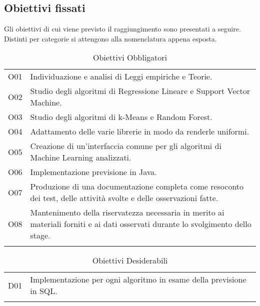 \subsection{Obiettivi fissati}
Gli obiettivi di cui viene previsto il raggiungimento sono presentati a seguire. Distinti per categorie si attengono alla nomenclatura appena esposta.
{\renewcommand{\arraystretch}{2}
\begin{longtable}{|p{1cm}| p{12.25cm}|}
	\hline
	\rowcolor{blue} \multicolumn{2}{|c|}{
	\textbf{\textcolor{white}{Obbligatori}}
	} \\
		\endhead
		\hline \rowcolor{lightbrown}
		O01 & 
		Individuazione e analisi di Leggi empiriche  e Teorie. \\	
		\hline \rowcolor{lighterbrown}
		O02 & 
		Studio degli algoritmi di Regressione Lineare e Support Vector Machine. \\	
		\hline \rowcolor{lightbrown}
		O03 & 
		Studio degli algoritmi di k-Means e Random Forest.\\	
	\hline \rowcolor{lighterbrown}
		O04 & 
		Adattamento delle varie librerie in modo da renderle uniformi.\\	
	\hline \rowcolor{lightbrown}
		O05 & 
		Creazione di un'interfaccia comune per gli algoritmi di Machine Learning analizzati.\\	
	\hline \rowcolor{lighterbrown}
		O06 & 
		Implementazione previsione in Java.\\	
	\hline \rowcolor{lightbrown}
		O07 & 
		Produzione di una documentazione completa come resoconto dei test, delle attività svolte e delle osservazioni fatte.\\	
	\hline \rowcolor{lighterbrown}
		O08 & 
		Mantenimento della riservatezza necessaria in merito ai materiali forniti e ai dati osservati durante lo svolgimento dello stage.\\	
	\hline
	\caption{Obiettivi Obbligatori}\label{tab:obb-ob}
\end{longtable}}

{\renewcommand{\arraystretch}{2}
\begin{longtable}{|p{1cm}| p{12.25cm} |}
	\hline
	\rowcolor{blue} \multicolumn{2}{|c|}{
	{\textcolor{white}{Desiderabili}}
	} \\
		\endhead
		\hline \rowcolor{lightbrown}
		D01 & 
		Implementazione per ogni algoritmo in esame della previsione in SQL.\\	
	\hline
	\caption{Obiettivi Desiderabili}\label{tab:des-ob}
\end{longtable}}

